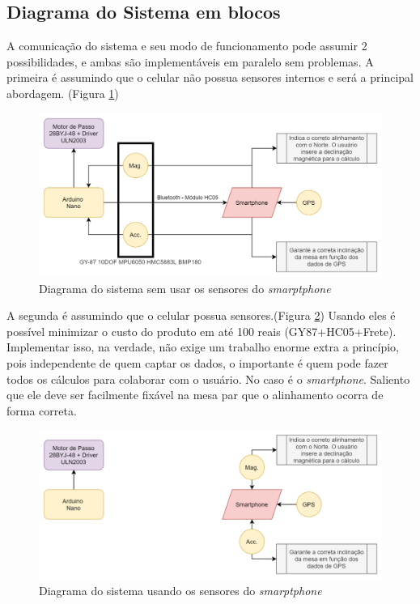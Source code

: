 \documentclass[a4paper, 12pt]{article}
\begin{document}
\subsection{Diagrama do Sistema em blocos}

A comunicação do sistema e seu modo de funcionamento pode assumir 2 possibilidades, e ambas são implementáveis em paralelo sem problemas. A primeira é assumindo que o celular não possua sensores internos e será a principal abordagem. (Figura \ref{fig:prjafttcc-page-1})

\begin{figure}[!htb]
	\centering
	\includegraphics[width=0.8\linewidth]{imagens/PRJ_AFT_TCC-Page-2}
	\caption{Diagrama do sistema sem usar os sensores do \textit{smarptphone}}
	\label{fig:prjafttcc-page-1}
\end{figure}


A segunda é assumindo que o celular possua sensores.(Figura \ref{fig:prjafttcc-page-2}) Usando eles é possível minimizar o custo do produto em até 100 reais (GY87+HC05+Frete). Implementar isso, na verdade, não exige um trabalho enorme extra a princípio, pois independente de quem captar os dados, o importante é quem pode fazer todos os cálculos para colaborar com o usuário. No caso é o \textit{smartphone}. Saliento que ele deve ser facilmente fixável na mesa par que o alinhamento ocorra de forma correta.

\begin{figure}[!htb]
	\centering
	\includegraphics[width=0.8\linewidth]{imagens/PRJ_AFT_TCC-Page-1}
	\caption{Diagrama do sistema usando os sensores do \textit{smarptphone}}
	\label{fig:prjafttcc-page-2}
\end{figure}
\end{document}
